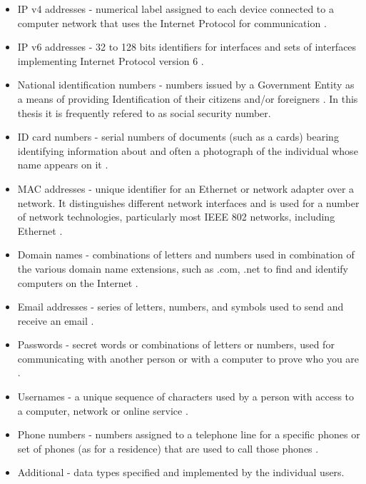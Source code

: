 \documentclass[a4paper,twoside,12pt]{book}
\begin{document}
\begin{itemize}
   \item IP v4 addresses - numerical label assigned to each device connected to a computer network that uses the Internet Protocol for communication \cite{bib:articleIP}.
   \item IP v6 addresses - 32 to 128 bits identifiers for interfaces and sets of interfaces implementing Internet Protocol version 6 \cite{bib:articleIPv6}\cite{bib:articleIPv6Address}. 
   \item National identification numbers - numbers issued by a Government Entity as a means of providing Identification of their citizens and/or foreigners \cite{bib:internetIdentityNumber}.
   In this thesis it is frequently refered to as social security number.
   \item ID card numbers - serial numbers of documents (such as a cards) bearing identifying information about and often a photograph of the individual whose 
   name appears on it \cite{bib:internetID}. 
   \item MAC addresses - unique identifier for an Ethernet or network adapter over a network. It distinguishes different network interfaces and is used for a number 
   of network technologies, particularly most IEEE 802 networks, including Ethernet \cite{bib:internetMAC}.
   \item Domain names - combinations of letters and numbers used in combination of the various domain name extensions, such as .com, .net to find and 
   identify computers on the Internet \cite{bib:internetDomain}.
   \item Email addresses - series of letters, numbers, and symbols used to send and receive an email \cite{bib:internetEmail}.
   \item Passwords - secret words or combinations of letters or numbers, used for communicating with another person or with a computer to prove who you are \cite{bib:internetPassword}.
   \item Usernames - a unique sequence of characters used by a person with access to a computer, network or online service \cite{bib:internetUsername}.
   \item Phone numbers - numbers assigned to a telephone line for a specific phones or set of phones (as for a residence) that are used to call those phones \cite{bib:internetPhone}.
   \item Additional - data types specified and implemented by the individual users.
\end{itemize}
\end{document}
